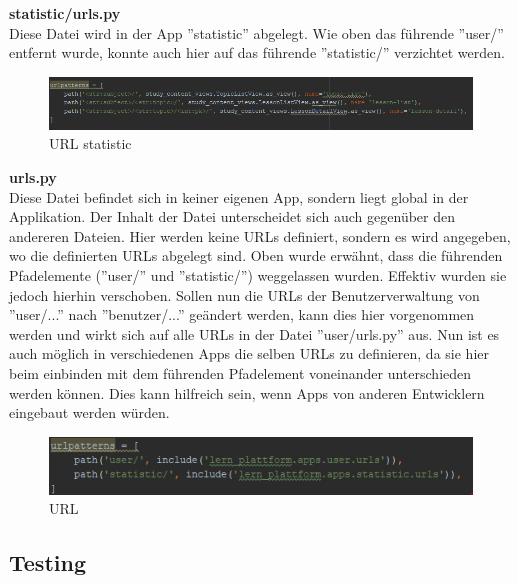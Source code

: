 \noindent \textbf{statistic/urls.py} \\
Diese Datei wird in der App ''statistic'' abgelegt. Wie oben das führende ''user/'' entfernt wurde, konnte auch hier auf das führende ''statistic/'' verzichtet werden. \\
\begin{minipage}{\textwidth}
	\begin{figure}[H]
		\includegraphics[width=\textwidth, height=\textheight, keepaspectratio]{images/URLstatistic.png}
		\caption{URL statistic}
	\end{figure}
\end{minipage}


\noindent \textbf{urls.py} \\
Diese Datei befindet sich in keiner eigenen App, sondern liegt global in der Applikation. Der Inhalt der Datei unterscheidet sich auch gegenüber den andereren Dateien. Hier werden keine URLs definiert, sondern es wird angegeben, wo die definierten URLs abgelegt sind. Oben wurde erwähnt, dass die führenden Pfadelemente (''user/'' und ''statistic/'') weggelassen wurden. Effektiv wurden sie jedoch hierhin verschoben. Sollen nun die URLs der Benutzerverwaltung von ''user/...'' nach ''benutzer/...'' geändert werden, kann dies hier vorgenommen werden und wirkt sich auf alle URLs in der Datei ''user/urls.py'' aus. Nun ist es auch möglich in verschiedenen Apps die selben URLs zu definieren, da sie hier beim einbinden mit dem führenden Pfadelement voneinander unterschieden werden können. Dies kann hilfreich sein, wenn Apps von anderen Entwicklern eingebaut werden würden. \\
\begin{minipage}{\textwidth}
	\begin{figure}[H]
		\includegraphics[width=\textwidth, height=\textheight, keepaspectratio]{images/URLglobal.png}
		\caption{URL}
	\end{figure}
\end{minipage}




\subsection{Testing}

